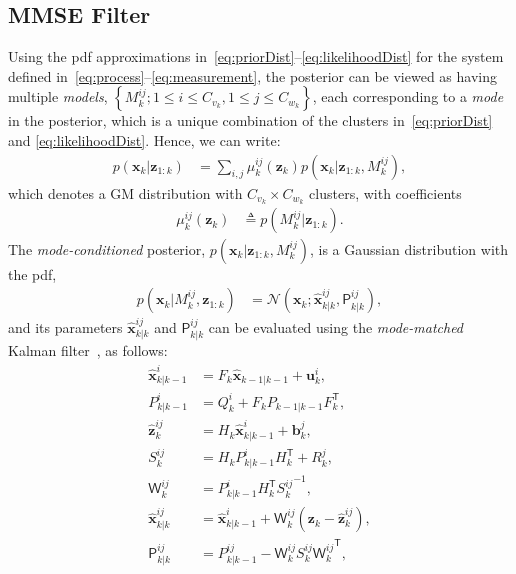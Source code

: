 \documentclass[10pt,twocolumn,twoside]{IEEEtran}
\newcommand{\tran}{^{\mathsf{T}}}
\begin{document}
\subsection{MMSE Filter}
\label{sec:GSF}
Using the pdf approximations in~\eqref{eq:priorDist}--\eqref{eq:likelihoodDist} for the system defined in~\eqref{eq:process}--\eqref{eq:measurement}, the posterior can be viewed as having multiple \textit{models}, \(\left\lbrace M_{k}^{ij}; 1 \leq i \leq {C_{v_k}}, 1\leq j \leq {C_{w_k}} \right\rbrace\), each corresponding to a \textit{mode} in the posterior, which is a unique combination of the clusters in~\eqref{eq:priorDist} and \eqref{eq:likelihoodDist}. Hence, we can write:
\begin{align}
\label{eq:GSFmergedposterior}
p {\left(\mathbf{x}_k | \mathbf{z}_{1:k}\right)} & = \sum \limits _{i,j} \mu_k^{ij}{\left(\mathbf{z}_{k}\right)}p{\left(\mathbf{x}_k \big| \mathbf{z}_{1:k},M_{k}^{ij}\right)},
\end{align}
which denotes a GM distribution with \({C_{v_k}}\times{C_{w_k}}\) clusters, with coefficients
\begin{align}
\mu_k^{ij}{\left(\mathbf{z}_{k}\right)} & \triangleq  p {\left(M_{k}^{ij}\big|\mathbf{z}_{1:k}\right)}.
\end{align}
The \textit{mode-conditioned} posterior, \(p {\left(\mathbf{x}_k \big| \mathbf{z}_{1:k},M_{k}^{ij}\right)}\), is a Gaussian distribution with the pdf,
\begin{align}
\label{eq:individualKFposterior}
p {\left( \mathbf{x}_k \big|M_{k}^{ij},\mathbf{z}_{1:k} \right)} & = \mathcal{N} {\left(\mathbf{x}_k; \mathsf{\hat{\boldsymbol{x}}}_{k|k}^{ij}, \mathsf{P}_{k|k}^{ij}\right)},
\end{align}
and its parameters \(\mathsf{\hat{\boldsymbol{x}}}_{k|k}^{ij}\) and \(\mathsf{P}_{k|k}^{ij}\) can be evaluated using the \textit{mode-matched} Kalman filter~\cite{ho_bayesian_1964,bar2001estimation}, as follows:
\begin{align}
\label{eq:ijpredictedState}
\mathbf{\hat{x}}_{k|k-1}^{i} &= F_{k}\mathbf{\hat{x}}_{k-1|k-1} + \mathbf{u}_k^{i},
\\ \label{eq:ijpredictedCov} P_{k|k-1}^{i} & = Q_k^{i}+F_kP_{k-1|k-1}F_k\tran,
\\ \label{eq:ijpredictedMeans} \mathbf{\hat{z}}_{k}^{ij} &= H_k\mathbf{\hat{x}}_{k|k-1}^{i} + \mathbf{b}_k^{j},
\\ \label{eq:ijInnovationCov} S_k^{ij} & = H_k P_{k|k-1}^{i}H_k\tran + R_k^j,
\\ \label{eq:ijKalGain} \mathsf{W}_k^{ij} &= P_{k|k-1}^{i}H_k\tran{S_k^{ij}}^{-1},
\\ \label{eq:ijestimatedState} \mathsf{\hat{\boldsymbol{x}}}_{k|k}^{ij} &=\mathbf{\hat{{x}}}_{k|k-1}^{i} +\mathsf{W}_k^{ij} \left(\mathbf{z}_{k} - \mathbf{\hat{z}}_{k}^{ij}\right) ,
\\ \label{eq:ijKalstateCov} \mathsf{P}_{k|k}^{ij} & = P_{k|k-1}^{ij} -\mathsf{W}_k^{ij}S_k^{ij}\mathsf{W}{_k^{ij}}\tran,
\end{align}
\end{document}
